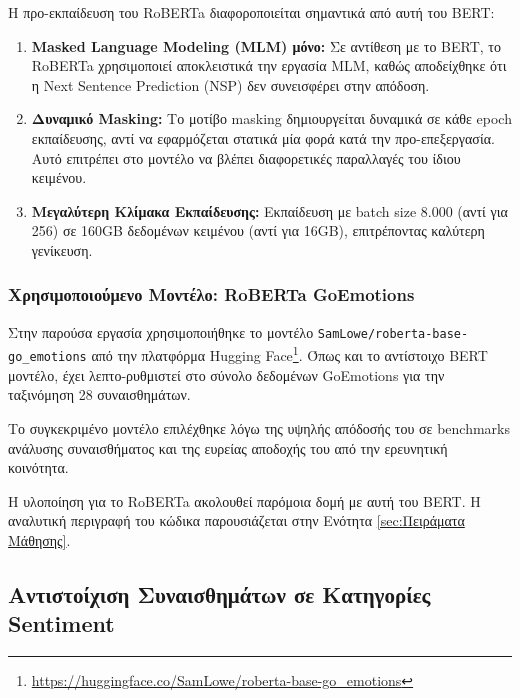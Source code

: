 \documentclass[a4paper,11pt,oneside,openany]{ioniothesis}
\begin{document}
Η προ-εκπαίδευση του RoBERTa διαφοροποιείται σημαντικά από αυτή του BERT:

\begin{enumerate}
    \item \textbf{Masked Language Modeling (MLM) μόνο:} Σε αντίθεση με το BERT, το RoBERTa χρησιμοποιεί αποκλειστικά την εργασία MLM, καθώς αποδείχθηκε ότι η Next Sentence Prediction (NSP) δεν συνεισφέρει στην απόδοση.
    
    \item \textbf{Δυναμικό Masking:} Το μοτίβο masking δημιουργείται δυναμικά σε κάθε epoch εκπαίδευσης, αντί να εφαρμόζεται στατικά μία φορά κατά την προ-επεξεργασία. Αυτό επιτρέπει στο μοντέλο να βλέπει διαφορετικές παραλλαγές του ίδιου κειμένου.
    
    \item \textbf{Μεγαλύτερη Κλίμακα Εκπαίδευσης:} Εκπαίδευση με batch size 8.000 (αντί για 256) σε 160GB δεδομένων κειμένου (αντί για 16GB), επιτρέποντας καλύτερη γενίκευση.
\end{enumerate}







\subsubsection{Χρησιμοποιούμενο Μοντέλο: RoBERTa GoEmotions}
\label{sec:Χρησιμοποιούμενο Μοντέλο RoBERTa GoEmotions}

Στην παρούσα εργασία χρησιμοποιήθηκε το μοντέλο \texttt{SamLowe/roberta-base-go\_emotions} από την πλατφόρμα Hugging Face\footnote{\url{https://huggingface.co/SamLowe/roberta-base-go_emotions}}. Όπως και το αντίστοιχο BERT μοντέλο, έχει λεπτο-ρυθμιστεί στο σύνολο δεδομένων GoEmotions για την ταξινόμηση 28 συναισθημάτων.

Το συγκεκριμένο μοντέλο επιλέχθηκε λόγω της υψηλής απόδοσής του σε benchmarks ανάλυσης συναισθήματος και της ευρείας αποδοχής του από την ερευνητική κοινότητα.

Η υλοποίηση για το RoBERTa ακολουθεί παρόμοια δομή με αυτή του BERT. Η αναλυτική περιγραφή του κώδικα παρουσιάζεται στην Ενότητα \ref{sec:Πειράματα Μάθησης}.

\subsection{Αντιστοίχιση Συναισθημάτων σε Κατηγορίες Sentiment}
\label{sec:Αντιστοίχιση Συναισθημάτων σε Κατηγορίες Sentiment}
\end{document}
